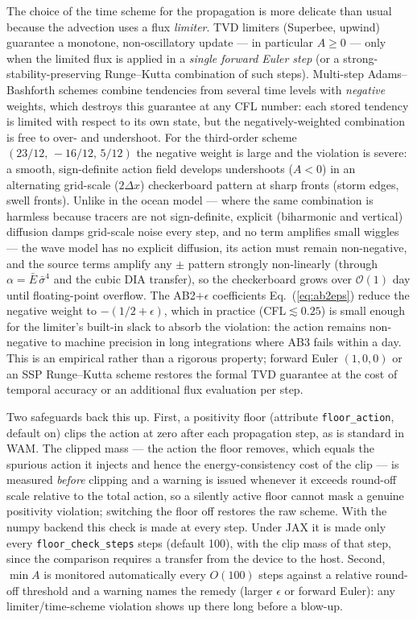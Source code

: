 \documentclass[12pt]{article}
\newcommand{\eq }  [1]{Eq.~(\ref{#1})}  %
\begin{document}
The choice of the time scheme for the propagation is more delicate than usual
because the advection uses a flux \emph{limiter}. TVD limiters (Superbee,
upwind) guarantee a monotone, non-oscillatory update --- in particular
$A \ge 0$ --- only when the limited flux is applied in a \emph{single forward
Euler step} (or a strong-stability-preserving Runge--Kutta combination of such
steps). Multi-step Adams--Bashforth schemes combine tendencies from several time
levels with \emph{negative} weights, which destroys this guarantee at any CFL
number: each stored tendency is limited with respect to its own state, but the
negatively-weighted combination is free to over- and undershoot. For the
third-order scheme $(23/12,\,-16/12,\,5/12)$ the negative weight is large and
the violation is severe: a smooth, sign-definite action field develops
undershoots ($A < 0$) in an alternating grid-scale ($2\Delta x$) checkerboard
pattern at sharp fronts (storm edges, swell fronts). Unlike in the ocean
model --- where the same combination is harmless because tracers are not
sign-definite, explicit (biharmonic and vertical) diffusion damps grid-scale
noise every step, and no term amplifies small wiggles --- the wave model has no
explicit diffusion, its action must remain non-negative, and the source terms
amplify any $\pm$ pattern strongly non-linearly (through
$\alpha = \bar E\,\bar\sigma^4$ and the cubic DIA transfer), so the checkerboard
grows over $\mathcal{O}(1)$ day until floating-point overflow. The AB2$+\epsilon$
coefficients \eq{eq:ab2eps} reduce the negative weight to $-(1/2+\epsilon)$,
which in practice (CFL${}\lesssim 0.25$) is small enough for the limiter's
built-in slack to absorb the violation: the action remains non-negative to
machine precision in long integrations where AB3 fails within a day. This is an
empirical rather than a rigorous property; forward Euler $(1,0,0)$ or an SSP
Runge--Kutta scheme restores the formal TVD guarantee at the cost of temporal
accuracy or an additional flux evaluation per step.

Two safeguards back this up. First, a positivity floor (attribute
\verb|floor_action|, default on) clips the action at zero after each
propagation step, as is standard in WAM. The clipped mass --- the action the
floor removes, which equals the spurious action it injects and hence the
energy-consistency cost of the clip --- is measured \emph{before} clipping and
a warning is issued whenever it exceeds round-off scale relative to the total
action, so a silently active floor cannot mask a genuine positivity violation;
switching the floor off restores the raw scheme.
With the numpy backend this check is made at every step.
Under JAX it is made only every \verb|floor_check_steps| steps (default 100),
with the clip mass of that step, since the comparison requires a transfer
from the device to the host. Second, $\min A$ is monitored
automatically every $O(100)$ steps against a relative round-off threshold and a
warning names the remedy (larger $\epsilon$ or forward Euler): any
limiter/time-scheme violation shows up there long before a blow-up.
\end{document}

